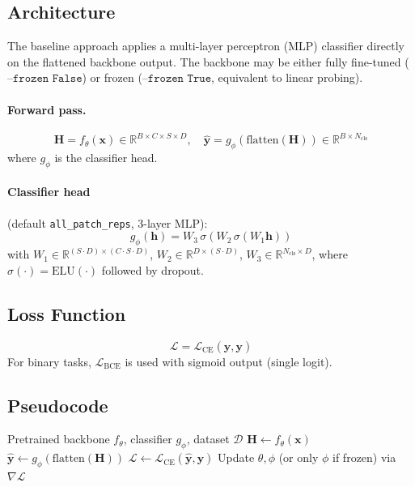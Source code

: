 \documentclass{article}
\newcommand{\R}{\mathbb{R}}
\newcommand{\mL}{\mathcal{L}}
\newcommand{\bx}{\bm{x}}
\begin{document}
\subsection{Architecture}

The baseline approach applies a multi-layer perceptron (MLP) classifier directly on the flattened backbone output.
The backbone may be either fully fine-tuned ($\texttt{--frozen False}$) or frozen ($\texttt{--frozen True}$, equivalent to linear probing).

\paragraph{Forward pass.}
\begin{equation}
\bm{H} = f_\theta(\bx) \in \R^{B \times C \times S \times D}, \quad
\hat{\bm{y}} = g_\phi\!\left(\text{flatten}(\bm{H})\right) \in \R^{B \times N_\text{cls}}
\end{equation}
where $g_\phi$ is the classifier head.

\paragraph{Classifier head} (default \texttt{all\_patch\_reps}, 3-layer MLP):
\begin{equation}
g_\phi(\bm{h}) = W_3\, \sigma\!\left( W_2\, \sigma\!\left( W_1 \bm{h} \right)\right)
\end{equation}
with $W_1 \in \R^{(S \cdot D) \times (C \cdot S \cdot D)}$, $W_2 \in \R^{D \times (S \cdot D)}$, $W_3 \in \R^{N_\text{cls} \times D}$, where $\sigma(\cdot) = \text{ELU}(\cdot)$ followed by dropout.

\subsection{Loss Function}

\begin{equation}
\mL = \mL_\text{CE}(\hat{\bm{y}}, \bm{y})
\end{equation}
For binary tasks, $\mL_\text{BCE}$ is used with sigmoid output (single logit).

\subsection{Pseudocode}

\begin{algorithm}[H]
\caption{Standard Fine-Tuning}
\begin{algorithmic}[1]
\REQUIRE Pretrained backbone $f_\theta$, classifier $g_\phi$, dataset $\mathcal{D}$
  \FOR{each mini-batch $(\bx, \bm{y}) \sim \mathcal{D}$}
    \STATE $\bm{H} \leftarrow f_\theta(\bx)$ 
    \STATE $\hat{\bm{y}} \leftarrow g_\phi(\text{flatten}(\bm{H}))$
    \STATE $\mL \leftarrow \mL_\text{CE}(\hat{\bm{y}}, \bm{y})$
    \STATE Update $\theta, \phi$ (or only $\phi$ if frozen) via $\nabla \mL$
  \ENDFOR
\ENDFOR
\end{algorithmic}
\end{algorithm}
\end{document}

